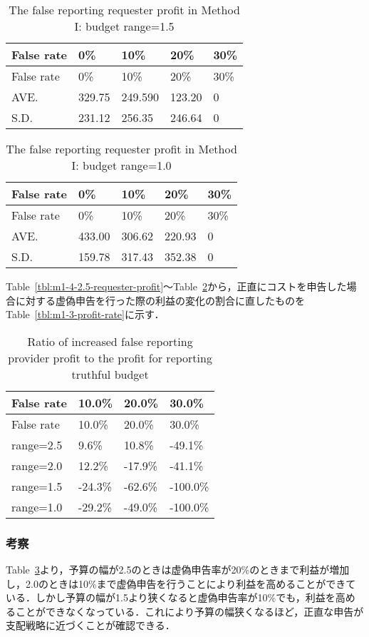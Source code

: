 \hypertarget{tbl:m1-4ux20131.5-requester-profit}{}
\begin{longtable}[H]{@{}lllll@{}}
\caption{\label{tbl:m1-4ux20131.5-requester-profit}The false reporting
requester profit in Method I: budget range=1.5}\tabularnewline
\toprule
False rate & 0\% & 10\% & 20\% & 30\%\tabularnewline
\midrule
\endfirsthead
\toprule
False rate & 0\% & 10\% & 20\% & 30\%\tabularnewline
\midrule
\endhead
AVE. & 329.75 & 249.590 & 123.20 & 0\tabularnewline
S.D. & 231.12 & 256.35 & 246.64 & 0\tabularnewline
\bottomrule
\end{longtable}

\hypertarget{tbl:m1-4-1.0-requester-profit}{}
\begin{longtable}[H]{@{}lllll@{}}
\caption{\label{tbl:m1-4-1.0-requester-profit}The false reporting
requester profit in Method I: budget range=1.0}\tabularnewline
\toprule
False rate & 0\% & 10\% & 20\% & 30\%\tabularnewline
\midrule
\endfirsthead
\toprule
False rate & 0\% & 10\% & 20\% & 30\%\tabularnewline
\midrule
\endhead
AVE. & 433.00 & 306.62 & 220.93 & 0\tabularnewline
S.D. & 159.78 & 317.43 & 352.38 & 0\tabularnewline
\bottomrule
\end{longtable}

Table~\ref{tbl:m1-4-2.5-requester-profit}〜Table~\ref{tbl:m1-4-1.0-requester-profit}から，正直にコストを申告した場合に対する虚偽申告を行った際の利益の変化の割合に直したものをTable~\ref{tbl:m1-3-profit-rate}に示す．

\hypertarget{tbl:m1-4-profit-rate}{}
\begin{longtable}[H]{@{}llll@{}}
\caption{\label{tbl:m1-4-profit-rate}Ratio of increased false reporting
provider profit to the profit for reporting truthful
budget}\tabularnewline
\toprule
False rate & 10.0\% & 20.0\% & 30.0\%\tabularnewline
\midrule
\endfirsthead
\toprule
False rate & 10.0\% & 20.0\% & 30.0\%\tabularnewline
\midrule
\endhead
range=2.5 & 9.6\% & 10.8\% & -49.1\%\tabularnewline
range=2.0 & 12.2\% & -17.9\% & -41.1\%\tabularnewline
range=1.5 & -24.3\% & -62.6\% & -100.0\%\tabularnewline
range=1.0 & -29.2\% & -49.0\% & -100.0\%\tabularnewline
\bottomrule
\end{longtable}

\hypertarget{ux8003ux5bdf-3}{%
\subsubsection{考察}\label{ux8003ux5bdf-3}}

Table~\ref{tbl:m1-4-profit-rate}より，予算の幅が2.5のときは虚偽申告率が20\%のときまで利益が増加し，2.0のときは10\%まで虚偽申告を行うことにより利益を高めることができている．しかし予算の幅が1.5より狭くなると虚偽申告率が10\%でも，利益を高めることができなくなっている．これにより予算の幅狭くなるほど，正直な申告が支配戦略に近づくことが確認できる．

